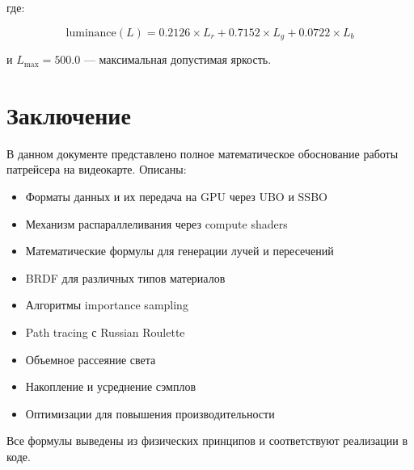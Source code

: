 \documentclass[14pt, a4paper]{extarticle}
\begin{document}
где:

\[
\text{luminance}(L) = 0.2126 \times L_r + 0.7152 \times L_g + 0.0722 \times L_b
\]

и $L_{\max} = 500.0$ --- максимальная допустимая яркость.

\section{Заключение}

В данном документе представлено полное математическое обоснование работы патрейсера на видеокарте. Описаны:

\begin{itemize}
    \item Форматы данных и их передача на GPU через UBO и SSBO
    \item Механизм распараллеливания через compute shaders
    \item Математические формулы для генерации лучей и пересечений
    \item BRDF для различных типов материалов
    \item Алгоритмы importance sampling
    \item Path tracing с Russian Roulette
    \item Объемное рассеяние света
    \item Накопление и усреднение сэмплов
    \item Оптимизации для повышения производительности
\end{itemize}

Все формулы выведены из физических принципов и соответствуют реализации в коде.
\end{document}
